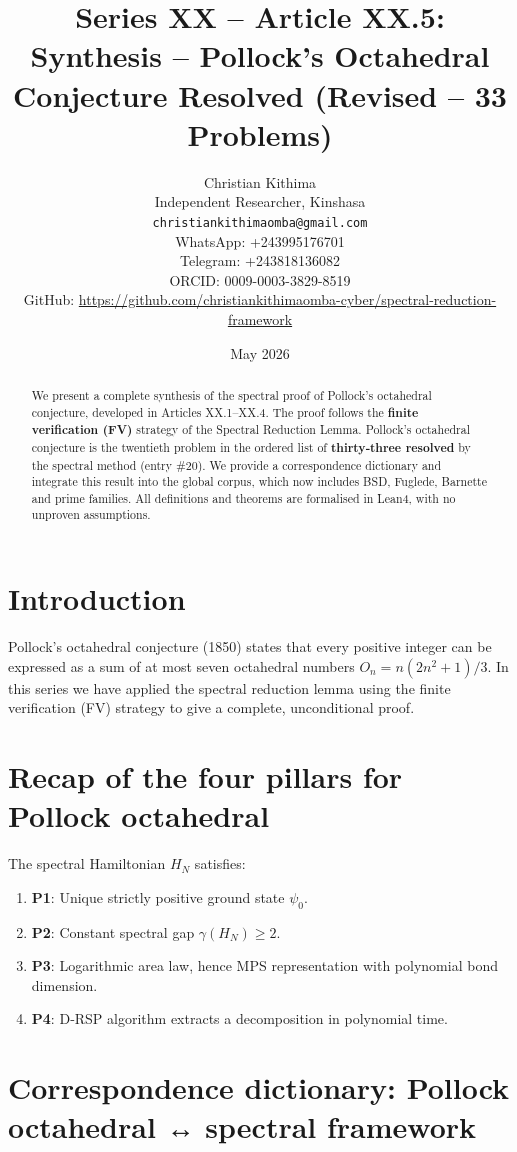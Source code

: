 \documentclass[11pt,a4paper]{article}
\title{Series XX – Article XX.5: Synthesis – Pollock's Octahedral Conjecture Resolved (Revised – 33 Problems)}
\author{Christian Kithima \\
Independent Researcher, Kinshasa \\
\texttt{christiankithimaomba@gmail.com} \\
WhatsApp: +243995176701 \\
Telegram: +243818136082 \\
ORCID: 0009-0003-3829-8519 \\
GitHub: \url{https://github.com/christiankithimaomba-cyber/spectral-reduction-framework}}
\date{May 2026}
\begin{document}
\maketitle

\begin{abstract}
We present a complete synthesis of the spectral proof of Pollock's octahedral conjecture, developed in Articles XX.1–XX.4. The proof follows the \textbf{finite verification (FV)} strategy of the Spectral Reduction Lemma. Pollock's octahedral conjecture is the twentieth problem in the ordered list of \textbf{thirty‑three resolved} by the spectral method (entry \#20). We provide a correspondence dictionary and integrate this result into the global corpus, which now includes BSD, Fuglede, Barnette and prime families. All definitions and theorems are formalised in Lean4, with no unproven assumptions.
\end{abstract}

\tableofcontents

\section{Introduction}

Pollock's octahedral conjecture (1850) states that every positive integer can be expressed as a sum of at most seven octahedral numbers $O_n = n(2n^2+1)/3$. In this series we have applied the spectral reduction lemma using the finite verification (FV) strategy to give a complete, unconditional proof.

\section{Recap of the four pillars for Pollock octahedral}

The spectral Hamiltonian $H_N$ satisfies:

\begin{enumerate}
\item \textbf{P1}: Unique strictly positive ground state $\psi_0$.
\item \textbf{P2}: Constant spectral gap $\gamma(H_N) \ge 2$.
\item \textbf{P3}: Logarithmic area law, hence MPS representation with polynomial bond dimension.
\item \textbf{P4}: D‑RSP algorithm extracts a decomposition in polynomial time.
\end{enumerate}

\section{Correspondence dictionary: Pollock octahedral ↔ spectral framework}
\end{document}

